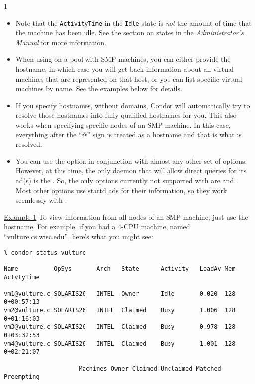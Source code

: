 \begin{ManPage}{\label{man-condor-status}}{1}
\begin{itemize}
	\item Note that the \texttt{ActivityTime} in the \texttt{Idle} state is
	\emph{not} the amount of time that the machine has been idle.  See the
	section on  states in the \emph{Administrator's Manual}
	for more information.

	\item When using  on a pool with SMP machines,
	you can either provide the hostname, in which case you will
	get back information about all virtual machines that are
	represented on that host, or you can list specific virtual
	machines by name.  
	See the examples below for details.

	\item If you specify hostnames, without domains, Condor will
	automatically try to resolve those hostnames into fully
	qualified hostnames for you.
	This also works when specifying specific nodes of an SMP
	machine.
	In this case, everything after the ``@'' sign is treated as a
	hostname and that is what is resolved.

	\item You can use the  option in conjunction with
	almost any other set of options.
	However, at this time, the only daemon that will allow direct
	queries for its ad(s) is the .
	So, the only options currently not supported with
	 are  and .
	Most other options use startd ads for their information, so
	they work seemlessly with .

\end{itemize}

\Examples

\underline{Example 1} To view information from all nodes of an SMP
machine, just use the hostname.
For example, if you had a 4-CPU machine, named
``vulture.cs.wisc.edu'', here's what you might see:
\begin{verbatim}
% condor_status vulture

Name          OpSys       Arch   State      Activity   LoadAv Mem   ActvtyTime

vm1@vulture.c SOLARIS26   INTEL  Owner      Idle       0.020  128   0+00:57:13
vm2@vulture.c SOLARIS26   INTEL  Claimed    Busy       1.006  128   0+01:16:03
vm3@vulture.c SOLARIS26   INTEL  Claimed    Busy       0.978  128   0+03:32:53
vm4@vulture.c SOLARIS26   INTEL  Claimed    Busy       1.001  128   0+02:21:07

                     Machines Owner Claimed Unclaimed Matched Preempting


\end{verbatim}
\end{ManPage}
